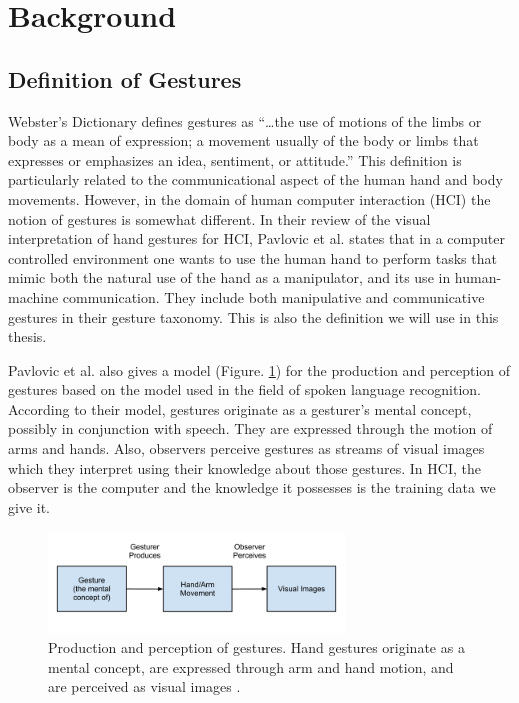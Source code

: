 \section{Background}
\subsection{Definition of Gestures}
Webster's Dictionary defines gestures as ``\ldots the use of motions of the
limbs or body as a mean of expression; a movement usually of the body or limbs
that expresses or emphasizes an idea, sentiment, or attitude.'' This definition
is particularly related to the communicational aspect of the human hand and body
movements. However, in the domain of human computer interaction (HCI) the notion
of gestures is somewhat different. In their review of the visual interpretation
of hand gestures for HCI, Pavlovic et al. \cite{Pavlovic97} states that in a computer
controlled environment one wants to use the human hand to perform tasks that
mimic both the natural use of the hand as a manipulator, and its use in
human-machine communication. They include both manipulative and communicative
gestures in their gesture taxonomy. This is also the definition we will use in
this thesis.

Pavlovic et al. \cite{Pavlovic97} also gives a model (Figure. 
\ref{fig:gesture_production}) for the production and perception of gestures 
based on the model used in the field of spoken language recognition. According 
to their model, gestures originate as a gesturer's mental concept, possibly in 
conjunction with speech. They are expressed through the motion of arms and 
hands. Also, observers perceive gestures as streams of visual images which they
interpret using their knowledge about those gestures. In HCI, the 
observer is the computer and the knowledge it possesses is the training data we 
give it.

\begin{figure}[h]
  \centering
  \includegraphics[width=0.7\textwidth]{figures/gesture_production.png} 
  \caption{Production and perception of gestures. Hand gestures originate as a
  mental concept, are expressed through arm and hand motion, and are perceived
  as visual images \cite{Pavlovic97}.}
  \label{fig:gesture_production}
\end{figure}

